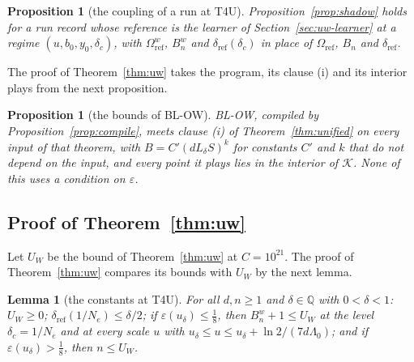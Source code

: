 \documentclass[11pt]{amsart}
\newtheorem{lemma}[theorem]{Lemma}
\newtheorem{proposition}[theorem]{Proposition}
\theoremstyle{definition}
\numberwithin{equation}{section}
\newcommand{\cK}{\mathcal{K}}
\begin{document}
\begin{proposition}[the coupling of a run at T4U]\label{prop:shadoww}
Proposition~\ref{prop:shadow} holds for a run record whose reference is the learner of Section~\ref{sec:uw-learner} at a regime $(u,b_0,y_0,\delta_c)$, with $\Omega^w_{\mathrm{ref}}$, $B^w_n$ and $\delta_{\mathrm{ref}}(\delta_c)$ in place of $\Omega_{\mathrm{ref}}$, $B_n$ and $\delta_{\mathrm{ref}}$.
\end{proposition}
The proof of Theorem~\ref{thm:uw} takes the program, its clause (i) and its interior plays from the next proposition.

\begin{proposition}[the bounds of BL-OW]\label{prop:blcostw}
BL-OW, compiled by Proposition~\ref{prop:compile}, meets clause (i) of Theorem~\ref{thm:unified} on every input of that theorem, with $B=C'(dL_\delta S)^k$ for constants $C'$ and $k$ that do not depend on the input, and every point it plays lies in the interior of $\cK$. None of this uses a condition on $\varepsilon$.
\end{proposition}

\subsection{Proof of Theorem~\ref{thm:uw}}\label{sec:uw-proof}

Let $U_W$ be the bound of Theorem~\ref{thm:uw} at $C=10^{21}$. The proof of Theorem~\ref{thm:uw} compares its bounds with $U_W$ by the next lemma.

\begin{lemma}[the constants at T4U]\label{lem:thrw}
For all $d,n\ge1$ and $\delta\in\mathbb Q$ with $0<\delta<1$: $U_W\ge0$; $\delta_{\mathrm{ref}}(1/N_e)\le\delta/2$; if $\varepsilon(u_\delta)\le\frac18$, then $B^w_n+1\le U_W$ at the level $\delta_c=1/N_e$ and at every scale $u$ with $u_\delta\le u\le u_\delta+\ln2/(7d\Lambda_0)$; and if $\varepsilon(u_\delta)>\frac18$, then $n\le U_W$.
\end{lemma}
\end{document}
